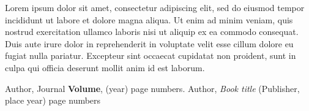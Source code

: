 Lorem ipsum dolor sit amet, consectetur adipiscing elit, sed do eiusmod tempor incididunt ut labore et dolore magna aliqua. Ut enim ad minim veniam, quis nostrud exercitation ullamco laboris nisi ut aliquip ex ea commodo consequat. Duis aute irure dolor in reprehenderit in voluptate velit esse cillum dolore eu fugiat nulla pariatur. Excepteur sint occaecat cupidatat non proident, sunt in culpa qui officia deserunt mollit anim id est laborum.

%
% 
% 
%
\begin{thebibliography}{}
%
%
Author, Journal \textbf{Volume}, (year) page numbers.
Author, \textit{Book title} (Publisher, place year) page numbers
\end{thebibliography}

